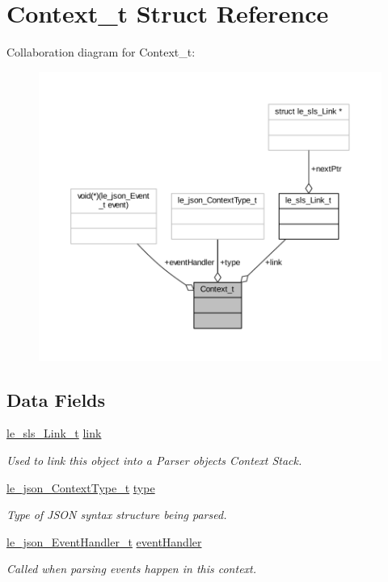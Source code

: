 \hypertarget{struct_context__t}{}\section{Context\+\_\+t Struct Reference}
\label{struct_context__t}


Collaboration diagram for Context\+\_\+t\+:
\nopagebreak
\begin{figure}[H]
\begin{center}
\leavevmode
\includegraphics[width=350pt]{struct_context__t__coll__graph}
\end{center}
\end{figure}
\subsection*{Data Fields}
\begin{DoxyCompactItemize}
\item 
\hyperlink{structle__sls___link__t}{le\+\_\+sls\+\_\+\+Link\+\_\+t} \hyperlink{struct_context__t_ad7010b1f7956a322009ddcf3e8b7e9f4}{link}
\begin{DoxyCompactList}\small\item\em Used to link this object into a Parser object\textquotesingle{}s Context Stack. \end{DoxyCompactList}\item 
\hyperlink{le__json_8h_afe24167ad9e64118dcd2c29b6c159c5b}{le\+\_\+json\+\_\+\+Context\+Type\+\_\+t} \hyperlink{struct_context__t_aaf8b15d30637a3a0e4ad6e8f131fe1ab}{type}
\begin{DoxyCompactList}\small\item\em Type of J\+S\+ON syntax structure being parsed. \end{DoxyCompactList}\item 
\hyperlink{le__json_8h_a3d0e516a3f0893f4b27d0e0e81d9615f}{le\+\_\+json\+\_\+\+Event\+Handler\+\_\+t} \hyperlink{struct_context__t_a809bc8337d10446dbe40ddadc27aeb57}{event\+Handler}
\begin{DoxyCompactList}\small\item\em Called when parsing events happen in this context. \end{DoxyCompactList}\end{DoxyCompactItemize}


